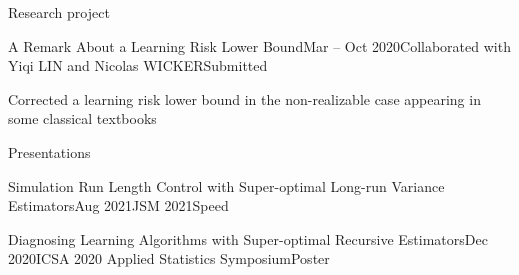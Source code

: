\documentclass[10pt]{resume} %
\begin{document}
\begin{rSection}{Research project}



\begin{rSubsection}{A Remark About a Learning Risk Lower Bound}{Mar -- Oct 2020}{Collaborated with Yiqi LIN and Nicolas WICKER}{Submitted}
\item Corrected a learning risk lower bound in the non-realizable case appearing in some classical textbooks
\end{rSubsection}

\end{rSection}


\begin{rSection}{Presentations}

\begin{rSecitem}{Simulation Run Length Control with Super-optimal Long-run Variance Estimators}{Aug 2021}{JSM 2021}{Speed}
\end{rSecitem}

\begin{rSecitem}{Diagnosing Learning Algorithms with Super-optimal Recursive Estimators}{Dec 2020}{ICSA 2020 Applied Statistics Symposium}{Poster}
\end{rSecitem}

\end{rSection}

\end{document}
